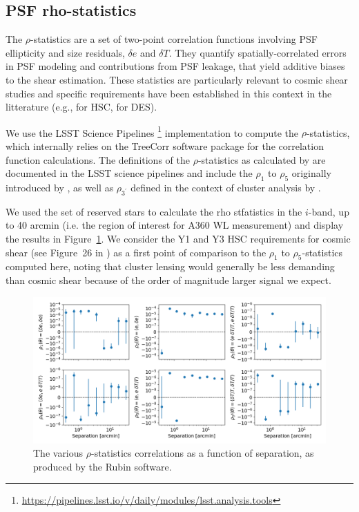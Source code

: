 \documentclass[SE,lsstdraft,authoryear,toc]{lsstdoc}
\begin{document}
\subsection{PSF rho-statistics}
The $\rho$-statistics \citep{2010MNRAS.404..350R, 2016MNRAS.460.2245J} are a set of two-point correlation functions involving PSF ellipticity and size residuals, $\delta e$ and $\delta T$. They quantify spatially-correlated errors in PSF modeling and contributions from PSF leakage, that yield additive biases to the shear estimation. These statistics are particularly relevant to cosmic shear studies and specific requirements have been established in this context in the litterature (e.g., \citealp{2018PASJ...70S..25M, 2022PASJ...74..421L} for HSC,  \citealp{2018MNRAS.481.1149Z, 2021MNRAS.504.4312G} for DES). 

We use the LSST Science Pipelines \footnote{\url{https://pipelines.lsst.io/v/daily/modules/lsst.analysis.tools}} implementation to compute the $\rho$-statistics, which internally relies on the TreeCorr software package \citep{2015ascl.soft08007J} for the correlation function calculations. The definitions of the $\rho$-statistics as calculated by  are documented in the LSST science pipelines and include the $\rho_1$ to $\rho_5$ originally introduced by \citet{2010MNRAS.404..350R, 2016MNRAS.460.2245J}, as well as $\rho_{3^\prime}$ defined in the context of cluster analysis by \citet{2015MNRAS.449.2219M}.

We used the set of reserved stars to calculate the rho stfatistics in the $i$-band, up to 40 arcmin (i.e. the region of interest for A360 WL measurement) and display the results in Figure~\ref{fig:rho_stat}. We consider the Y1 and Y3 HSC requirements for cosmic shear (see Figure~26 in \citealp{2022PASJ...74..421L}) as a first point of comparison to the $\rho_1$ to $\rho_5$-statistics computed here, noting that cluster lensing would generally be less demanding than cosmic shear because of the order of magnitude larger signal we expect. 



\begin{figure}
\centering
\includegraphics[width=\textwidth]{Figures/rho_stat_noband.png}
\caption{The various $\rho$-statistics correlations as a function of separation, as produced by the Rubin  software.\label{fig:rho_stat}}
\end{figure}
\end{document}
